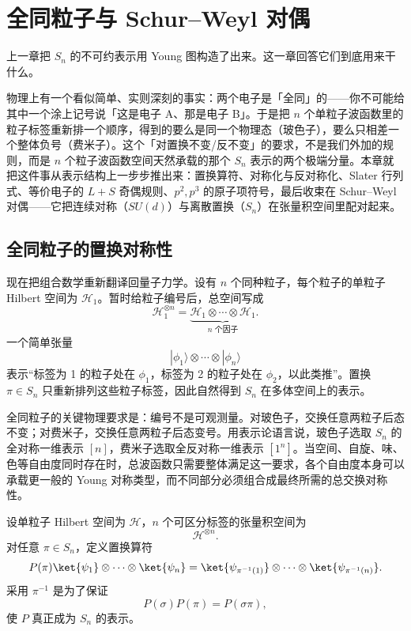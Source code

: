 \chapter{全同粒子与 Schur--Weyl 对偶}
\label{chap:identical-particles}

上一章把 $S_n$ 的不可约表示用 Young 图构造了出来。这一章回答它们到底用来干什么。

物理上有一个看似简单、实则深刻的事实：两个电子是「全同」的——你不可能给其中一个涂上记号说「这是电子 A、那是电子 B」。于是把 $n$ 个单粒子波函数里的粒子标签重新排一个顺序，得到的要么是同一个物理态（玻色子），要么只相差一个整体负号（费米子）。这个「对置换不变/反不变」的要求，不是我们外加的规则，而是 $n$ 个粒子波函数空间天然承载的那个 $S_n$ 表示的两个极端分量。本章就把这件事从表示结构上一步步推出来：置换算符、对称化与反对称化、Slater 行列式、等价电子的 $L+S$ 奇偶规则、$p^2,p^3$ 的原子项符号，最后收束在 Schur--Weyl 对偶——它把连续对称（$SU(d)$）与离散置换（$S_n$）在张量积空间里配对起来。

\section{全同粒子的置换对称性}
\label{sec:identical-particles}

现在把组合数学重新翻译回量子力学。设有 $n$ 个同种粒子，每个粒子的单粒子 Hilbert 空间为 $\mathcal H_1$。暂时给粒子编号后，总空间写成
\[
\mathcal H_1^{\otimes n}
=\underbrace{\mathcal H_1\otimes\cdots\otimes\mathcal H_1}_{n\text{ 个因子}}.
\]
一个简单张量
\[
|\phi_1\rangle\otimes\cdots\otimes|\phi_n\rangle
\]
表示“标签为 1 的粒子处在 $\phi_1$，标签为 2 的粒子处在 $\phi_2$，以此类推”。置换 $\pi\in S_n$ 只重新排列这些粒子标签，因此自然得到 $S_n$ 在多体空间上的表示。

全同粒子的关键物理要求是：编号不是可观测量。对玻色子，交换任意两粒子后态不变；对费米子，交换任意两粒子后态变号。用表示论语言说，玻色子选取 $S_n$ 的全对称一维表示 $[n]$，费米子选取全反对称一维表示 $[1^n]$。当空间、自旋、味、色等自由度同时存在时，总波函数只需要整体满足这一要求，各个自由度本身可以承载更一般的 Young 对称类型，而不同部分必须组合成最终所需的总交换对称性。


设单粒子 Hilbert 空间为 $\mathcal H$，$n$ 个可区分标签的张量积空间为
\[
\mathcal H^{\otimes n}.
\]
对任意 $\pi\in S_n$，定义置换算符
\begin{equation}
P(\pi)
\ket{\psi_1}\otimes\cdots\otimes\ket{\psi_n}
=
\ket{\psi_{\pi^{-1}(1)}}\otimes\cdots\otimes\ket{\psi_{\pi^{-1}(n)}}.
\label{eq:particle-permutation-operator}
\end{equation}
采用 $\pi^{-1}$ 是为了保证
\[
P(\sigma)P(\pi)=P(\sigma\pi),
\]
使 $P$ 真正成为 $S_n$ 的表示。

